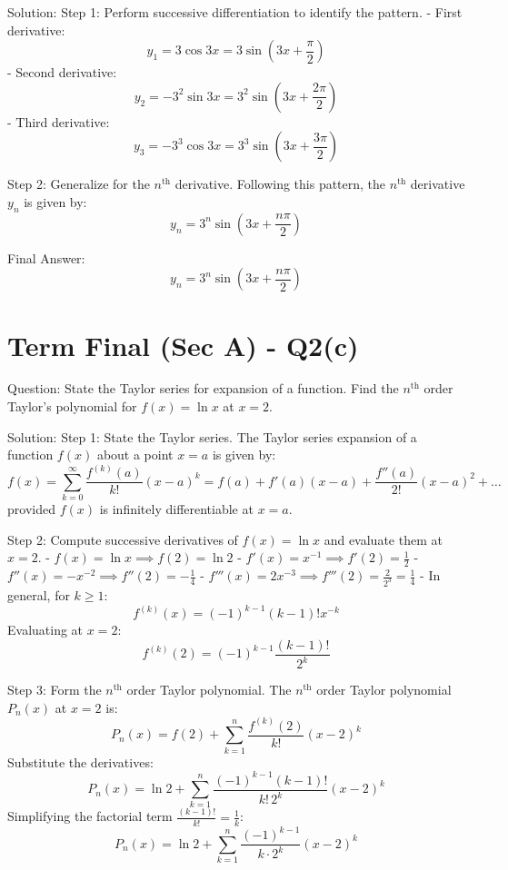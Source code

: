 \documentclass[11pt, a4paper]{article}
\begin{document}
Solution:
Step 1: Perform successive differentiation to identify the pattern.
- First derivative:
  $$y_1 = 3 \cos 3x = 3 \sin\left(3x + \frac{\pi}{2}\right)$$
- Second derivative:
  $$y_2 = -3^2 \sin 3x = 3^2 \sin\left(3x + \frac{2\pi}{2}\right)$$
- Third derivative:
  $$y_3 = -3^3 \cos 3x = 3^3 \sin\left(3x + \frac{3\pi}{2}\right)$$

Step 2: Generalize for the $n^{\text{th}}$ derivative.
Following this pattern, the $n^{\text{th}}$ derivative $y_n$ is given by:
$$y_n = 3^n \sin\left(3x + \frac{n\pi}{2}\right)$$

Final Answer:
$$
\boxed{y_n = 3^n \sin\left(3x + \frac{n\pi}{2}\right)}
$$


\section*{Term Final (Sec A) - Q2(c)}
Question:
State the Taylor series for expansion of a function. Find the $n^{\text{th}}$ order Taylor's polynomial for $f(x) = \ln x$ at $x = 2$.

Solution:
Step 1: State the Taylor series.
The Taylor series expansion of a function $f(x)$ about a point $x = a$ is given by:
$$f(x) = \sum_{k=0}^{\infty} \frac{f^{(k)}(a)}{k!} (x - a)^k = f(a) + f'(a)(x-a) + \frac{f''(a)}{2!}(x-a)^2 + \dots$$
provided $f(x)$ is infinitely differentiable at $x = a$.

Step 2: Compute successive derivatives of $f(x) = \ln x$ and evaluate them at $x = 2$.
- $f(x) = \ln x \implies f(2) = \ln 2$
- $f'(x) = x^{-1} \implies f'(2) = \frac{1}{2}$
- $f''(x) = -x^{-2} \implies f''(2) = -\frac{1}{4}$
- $f'''(x) = 2x^{-3} \implies f'''(2) = \frac{2}{2^3} = \frac{1}{4}$
- In general, for $k \ge 1$:
  $$f^{(k)}(x) = (-1)^{k-1} (k-1)! x^{-k}$$
  Evaluating at $x = 2$:
  $$f^{(k)}(2) = (-1)^{k-1} \frac{(k-1)!}{2^k}$$

Step 3: Form the $n^{\text{th}}$ order Taylor polynomial.
The $n^{\text{th}}$ order Taylor polynomial $P_n(x)$ at $x = 2$ is:
$$P_n(x) = f(2) + \sum_{k=1}^{n} \frac{f^{(k)}(2)}{k!} (x-2)^k$$
Substitute the derivatives:
$$P_n(x) = \ln 2 + \sum_{k=1}^{n} \frac{(-1)^{k-1}(k-1)!}{k! \, 2^k} (x-2)^k$$
Simplifying the factorial term $\frac{(k-1)!}{k!} = \frac{1}{k}$:
$$P_n(x) = \ln 2 + \sum_{k=1}^{n} \frac{(-1)^{k-1}}{k \cdot 2^k} (x-2)^k$$
\end{document}

